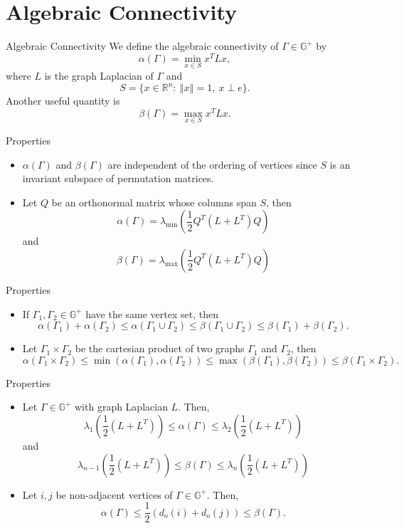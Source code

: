 \documentclass{beamer}
\newcommand\norm[1]{\left\Vert#1\right\Vert}
\begin{document}
\section{Algebraic Connectivity}

\begin{frame}{Algebraic Connectivity}
We define the algebraic connectivity of $\Gamma\in\mathbb{G}^{+}$ by
\vfill
\[
\alpha(\Gamma) = \min_{x\in S}x^{T}Lx,
\]
\vfill
where $L$ is the graph Laplacian of $\Gamma$ and
\vfill
\[
S = \{x\in\mathbb{R}^{n}\colon~\norm{x}=1,~x\perp e\}.
\]
\vfill
Another useful quantity is
\[
\beta(\Gamma) = \max_{x\in S}x^{T}Lx.
\]
\end{frame}

\begin{frame}{Properties}
\begin{itemize}
\item	$\alpha(\Gamma)$ and $\beta(\Gamma)$ are independent of the ordering of vertices since $S$ is an invariant subspace of permutation matrices.
\vfill
\item	Let $Q$ be an orthonormal matrix whose columns span $S$, then
	\[
	\alpha(\Gamma) = \lambda_{\text{min}}\left(\frac{1}{2}Q^{T}\left(L+L^{T}\right)Q\right)
	\]
and
	\[
	\beta(\Gamma) = \lambda_{\text{max}}\left(\frac{1}{2}Q^{T}\left(L+L^{T}\right)Q\right)
	\]
\end{itemize}
\end{frame}

\begin{frame}{Properties}
\begin{itemize}
\item	If $\Gamma_{1},\Gamma_{2}\in\mathbb{G}^{+}$ have the same vertex set, then
	\[
	\alpha(\Gamma_{1})+\alpha(\Gamma_{2}) \leq \alpha(\Gamma_{1}\cup\Gamma_{2}) \leq \beta(\Gamma_{1}\cup\Gamma_{2}) \leq \beta(\Gamma_{1})+\beta(\Gamma_{2}).
	\]
\vfill
\item	Let $\Gamma_{1}\times \Gamma_{2}$ be the cartesian product of two graphs $\Gamma_{1}$ and $\Gamma_{2}$, then
	\[
	\alpha(\Gamma_{1}\times\Gamma_{2})\leq\min(\alpha(\Gamma_{1}),\alpha(\Gamma_{2}))\leq\max(\beta(\Gamma_{1}),\beta(\Gamma_{2}))\leq\beta(\Gamma_{1}\times\Gamma_{2}).
	\]
\end{itemize}
\end{frame}

\begin{frame}{Properties}
\begin{itemize}
\item Let $\Gamma\in\mathbb{G}^{+}$ with graph Laplacian $L$. Then,
	\[
	\lambda_{1}\left(\frac{1}{2}(L+L^{T})\right)\leq\alpha(\Gamma)\leq\lambda_{2}\left(\frac{1}{2}(L+L^{T})\right)
	\]
	and
	\[
	\lambda_{n-1}\left(\frac{1}{2}(L+L^{T})\right)\leq\beta(\Gamma)\leq\lambda_{n}\left(\frac{1}{2}(L+L^{T})\right)
	\]
\item	Let $i,j$ be non-adjacent vertices of $\Gamma\in\mathbb{G}^{+}$. Then,
	\[
	\alpha(\Gamma)\leq\frac{1}{2}\left(d_{o}(i)+d_{o}(j)\right)\leq\beta(\Gamma).
	\]
\end{itemize}
\end{frame}
\end{document}
